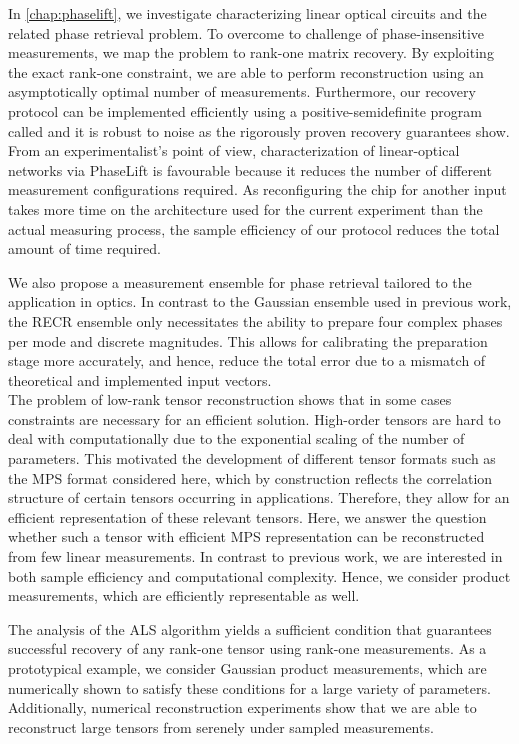 In \cref{chap:phaselift}, we investigate characterizing linear optical circuits and the related phase retrieval problem.
To overcome to challenge of phase-insensitive measurements, we map the problem to rank-one matrix recovery.
By exploiting the exact rank-one constraint, we are able to perform reconstruction using an asymptotically optimal number of measurements.
Furthermore, our recovery protocol can be implemented efficiently using a positive-semidefinite program called  and it is robust to noise as the rigorously proven recovery guarantees show.
From an experimentalist's point of view, characterization of linear-optical networks via PhaseLift is favourable because it reduces the number of different measurement configurations required.
As reconfiguring the chip for another input takes more time on the architecture used for the current experiment than the actual measuring process, the sample efficiency of our protocol reduces the total amount of time required.

We also propose a measurement ensemble for phase retrieval tailored to the application in optics.
In contrast to the Gaussian ensemble used in previous work, the RECR ensemble only necessitates the ability to prepare four complex phases per mode and discrete magnitudes.
This allows for calibrating the preparation stage more accurately, and hence, reduce the total error due to a mismatch of theoretical and implemented input vectors.\\



The problem of low-rank tensor reconstruction shows that in some cases constraints are necessary for an efficient solution.
High-order tensors are hard to deal with computationally due to the exponential scaling of the number of parameters.
This motivated the development of different tensor formats such as the MPS format considered here, which by construction reflects the correlation structure of certain tensors occurring in applications.
Therefore, they allow for an efficient representation of these relevant tensors.
Here, we answer the question whether such a tensor with efficient MPS representation can be reconstructed from few linear measurements.
In contrast to previous work, we are interested in both sample efficiency and computational complexity.
Hence, we consider product measurements, which are efficiently representable as well.

The analysis of the ALS algorithm yields a sufficient condition that guarantees successful recovery of any rank-one tensor using rank-one measurements.
As a prototypical example, we consider Gaussian product measurements, which are numerically shown to satisfy these conditions for a large variety of parameters.
Additionally, numerical reconstruction experiments show that we are able to reconstruct large tensors from serenely under sampled measurements.


